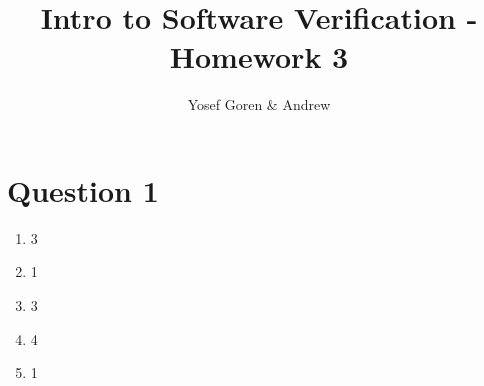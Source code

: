 \documentclass{article}
\begin{document}
\author{Yosef Goren \& Andrew }
\title{Intro to Software Verification - Homework 3}
\maketitle
\section*{Question 1}
\begin{enumerate}[label=\Alph*.]
    \item 3
    \item 1
    \item 3
    \item 4
    \item 1
\end{enumerate}
\end{document}
